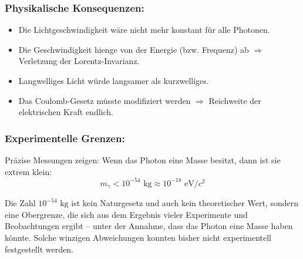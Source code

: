 \subsubsection*{Physikalische Konsequenzen:}
\begin{itemize}
	\item Die Lichtgeschwindigkeit w\"are nicht mehr konstant f\"ur alle Photonen.
	\item Die Geschwindigkeit hienge von der Energie (bzw. Frequenz) ab $\Rightarrow$ Verletzung der Lorentz-Invarianz.
	\item Langwelliges Licht w\"urde langsamer als kurzwelliges.
	\item Das Coulomb-Gesetz m\"usste modifiziert werden $\Rightarrow$ Reichweite der elektrischen Kraft endlich.
\end{itemize}

\subsubsection*{Experimentelle Grenzen:}
Pr\"azise Messungen zeigen: Wenn das Photon eine Masse besitzt, dann ist sie extrem klein:
\begin{equation}
	m_\gamma < 10^{-54} \text{ kg} \approx 10^{-18} \text{ eV}/c^2
\end{equation}

Die Zahl $10^{-54} \text{ kg}$ 	ist kein Naturgesetz und auch kein theoretischer Wert, sondern eine Obergrenze, die sich aus dem Ergebnis vieler Experimente und Beobachtungen ergibt – unter der Annahme, dass das Photon eine Masse haben könnte.
Solche winzigen Abweichungen konnten bisher nicht experimentell festgestellt werden.

